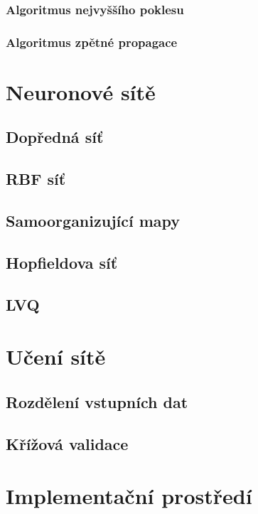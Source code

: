 \documentclass[11pt,twoside,a4paper]{book}
\begin{document}
\subsection{Algoritmus nejvyššího poklesu}
\subsection{Algoritmus zpětné propagace}

\chapter{Neuronové sítě}
\section{Dopředná síť}
\section{RBF síť}
\section{Samoorganizující mapy}
\section{Hopfieldova síť}
\section{LVQ}
\chapter{Učení sítě}
\section{Rozdělení vstupních dat}
\section{Křížová validace}

\chapter{Implementační prostředí}
\end{document}
